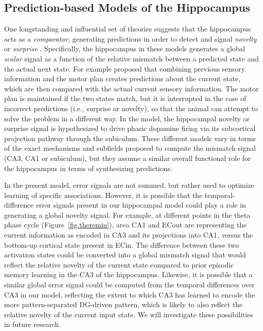\documentclass[11pt,twoside]{article}
\newif\myifpdf
\begin{document}
\subsection{Prediction-based Models of the Hippocampus}

One longstanding and influential set of theories suggests that the hippocampus acts as a \emph{comparator}, generating predictions in order to detect and signal \emph{novelty} or \emph{surprise} \citep{Gray82,Vinogradova01,LismanGrace05}.  Specifically, the hippocampus in these models generates a global \emph{scalar} signal as a function of the relative mismatch between a predicted state and the actual next state.  For example \citet{Gray82} proposed that combining previous sensory information and the motor plan creates predictions about the current state, which are then compared with the actual current sensory information.  The motor plan is maintained if the two states match, but it is interrupted in the case of incorrect predictions (i.e., surprise or novelty), so that the animal can attempt to solve the problem in a different way.  In the \citet{LismanGrace05} model, the hippocampal novelty or surprise signal is hypothesized to drive phasic dopamine firing via its subcortical projection pathway through the subiculum. These different models vary in terms of the exact mechanisms and subfields proposed to compute the mismatch signal (CA3, CA1 or subiculum), but they assume a similar overall functional role for the hippocampus in terms of synthesizing predictions. 

In the present model, error signals are not summed, but rather used to optimize learning of specific associations.  However, it is possible that the temporal-difference error signals present in our hippocampal model could play a role in generating a global novelty signal.  For example, at different points in the theta phase cycle (Figure~\ref{fig.theremin}), area CA1 and ECout are representing the current information as encoded in CA3 and its projections into CA1, versus the bottom-up cortical state present in ECin. The difference between these two activation states could be converted into a global mismatch signal that would reflect the relative novelty of the current state compared to prior episodic memory learning in the CA3 of the hippocampus.  Likewise, it is possible that a similar global error signal could be computed from the temporal differences over CA3 in our model, reflecting the extent to which CA3 has learned to encode the more pattern-separated DG-driven pattern, which is likely to also reflect the relative novelty of the current input state.  We will investigate these possibilities in future research. 
\end{document}
